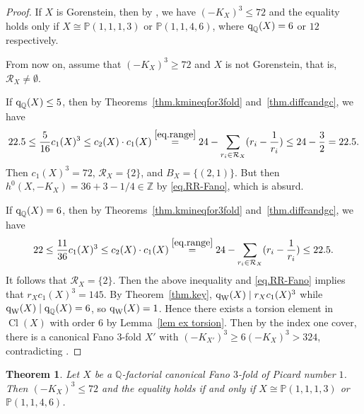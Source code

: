 \documentclass[12pt,twoside]{amsart}
\DeclareMathOperator{\Cl}{Cl}
\newcommand{\qW}{\text{\rm q}_{\text{\rm W}}}
\newcommand{\qQ}{\text{\rm q}_{\mathbb{Q}}}
\newtheorem{thm}{Theorem}[section]
\theoremstyle{definition}
\begin{document}
\begin{proof}
 If $X$ is Gorenstein, then by \cite[Theorem~1.5]{Prokhorov2005}, we have $(-K_X)^3\leq 72$ and the equality holds only if $X\cong \mathbb P(1,1,1,3)$ or $\mathbb P(1,1,4,6)$, where $\qQ(X)=6$ or $12$ respectively. %

 From now on, assume that $(-K_X)^3\geq 72$ and $X$ is not Gorenstein, that is, $\mathcal{R}_X\neq \emptyset$.
 
 If $\qQ(X)\leq 5$, then by Theorems~\ref{thm.kmineqfor3fold} and~\ref{thm.diffcandgc}, we have
 \[
 22.5\leq \frac{5}{16} c_1(X)^3\leq c_2(X)\cdot c_1(X)\stackrel{\eqref{eq.range}}{=} 24-\sum_{r_i\in \mathcal{R}_X}(r_i-\frac{1}{r_i}) \leq 24-\frac{3}{2}=22.5. 
 \]
Then $c_1(X)^3=72$, $\mathcal{R}_X=\{2\}$, and $B_X=\{(2,1)\}$. But then $h^0(X,-K_X)=36+3-1/4\in \mathbb Z$ by \eqref{eq.RR-Fano}, which is absurd.

 If $\qQ(X)=6$, then by Theorems~\ref{thm.kmineqfor3fold} and~\ref{thm.diffcandgc}, we have
 \[
 22\leq \frac{11}{36}c_1(X)^3\leq c_2(X)\cdot c_1(X) \stackrel{\eqref{eq.range}}{=}24-\sum_{r_i\in \mathcal{R}_X}(r_i-\frac{1}{r_i})\leq 22.5.
 \]
 It follows that $\mathcal{R}_X=\{2\}$. Then the above inequality and 
 \eqref{eq.RR-Fano} implies that $r_Xc_1(X)^3=145.$
 By Theorem~\ref{thm.key}, 
 $\qW(X)\mid r_Xc_1(X)^3$ while $\qW(X)\mid \qQ(X)=6$, so $\qW(X)=1$. Hence there exists a torsion element in $\Cl (X)$ with order $6$ by Lemma~\ref{lem ex torsion}. Then by the index one cover,
 there is a canonical Fano $3$-fold $X'$ with $(-K_{X'})^3\geq 6(-K_X)^3>324$, contradicting \cite[{Theorem~1.1}]{JiangZou2023}.
\end{proof}





\begin{thm}\label{thm.sharpboundofdegree}
 Let $X$ be a $\mathbb Q$-factorial canonical Fano $3$-fold of Picard number $1$. Then $(-K_X)^3\leq 72$ and the equality holds if and only if $X\cong \mathbb P(1,1,1,3)$ or $\mathbb P(1,1,4,6)$.
\end{thm}
\end{document}
